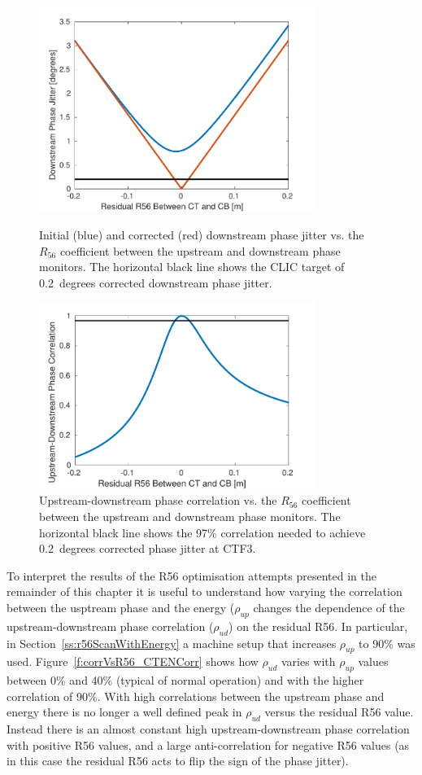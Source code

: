 \begin{figure}
  \centering
  \includegraphics[width=0.8\textwidth]{Figures/propagation/jitVsR56}
  \caption{Initial (blue) and corrected (red) downstream phase jitter vs. the \(R_{56}\) coefficient between the upstream and downstream phase monitors. The horizontal black line shows the CLIC target of 0.2~degrees corrected downstream phase jitter.}
  \label{f:jitVsR56}
  \includegraphics[width=0.8\textwidth]{Figures/propagation/corrVsR56}
  \caption{Upstream-downstream phase correlation vs. the \(R_{56}\) coefficient between the upstream and downstream phase monitors. The horizontal black line shows the 97\% correlation needed to achieve 0.2~degrees corrected phase jitter at CTF3.}
  \label{f:corrVsR56}
\end{figure}

To interpret the results of the R56 optimisation attempts presented in the remainder of this chapter it is useful to understand how varying the correlation between the usptream phase and the energy (\(\rho_{up}\) changes the dependence of the upstream-downstream phase correlation (\(\rho_{ud}\)) on the residual R56. In particular, in Section~\ref{ss:r56ScanWithEnergy} a machine setup that increases \(\rho_{up}\) to 90\% was used. Figure~\ref{f:corrVsR56_CTENCorr} shows how \(\rho_{ud}\) varies with \(\rho_{up}\) values between 0\% and 40\% (typical of normal operation) and with the higher correlation of 90\%. With high correlations between the upstream phase and energy there is no longer a well defined peak in \(\rho_{ud}\) versus the residual R56 value. Instead there is an almost constant high upstream-downstream phase correlation with positive R56 values, and a large anti-correlation for negative R56 values (as in this case the residual R56 acts to flip the sign of the phase jitter). 

